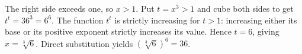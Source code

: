 The right side exceeds one, so $x>1$. Put $t=x^3>1$ and cube both sides to get $t^t=36^3=6^6$. The function $t^t$ is strictly increasing for $t>1$: increasing either its base or its positive exponent strictly increases its value. Hence $t=6$, giving $\boxed{x=\sqrt[3]6}$. Direct substitution yields $(\sqrt[3]6)^6=36$.
